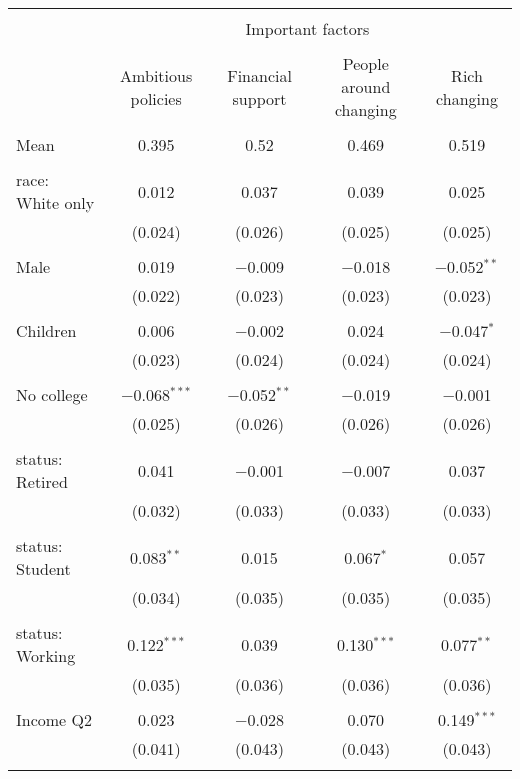 
\begin{tabular}{@{\extracolsep{5pt}}lcccc} 
\\[-1.8ex]\hline 
\hline \\[-1.8ex] 
 & \multicolumn{4}{c}{Important factors} \\ 
\cline{2-5} 
\\[-1.8ex] & Ambitious policies & Financial support & People around changing & Rich changing \\ 
\hline \\[-1.8ex] 
 Mean & 0.395 & 0.52 & 0.469 & 0.519  \\ \hline \\[-1.8ex] race: White only & 0.012 & 0.037 & 0.039 & 0.025 \\ 
  & (0.024) & (0.026) & (0.025) & (0.025) \\ 
  & & & & \\ 
 Male & 0.019 & $-$0.009 & $-$0.018 & $-$0.052$^{**}$ \\ 
  & (0.022) & (0.023) & (0.023) & (0.023) \\ 
  & & & & \\ 
 Children & 0.006 & $-$0.002 & 0.024 & $-$0.047$^{*}$ \\ 
  & (0.023) & (0.024) & (0.024) & (0.024) \\ 
  & & & & \\ 
 No college & $-$0.068$^{***}$ & $-$0.052$^{**}$ & $-$0.019 & $-$0.001 \\ 
  & (0.025) & (0.026) & (0.026) & (0.026) \\ 
  & & & & \\ 
 status: Retired & 0.041 & $-$0.001 & $-$0.007 & 0.037 \\ 
  & (0.032) & (0.033) & (0.033) & (0.033) \\ 
  & & & & \\ 
 status: Student & 0.083$^{**}$ & 0.015 & 0.067$^{*}$ & 0.057 \\ 
  & (0.034) & (0.035) & (0.035) & (0.035) \\ 
  & & & & \\ 
 status: Working & 0.122$^{***}$ & 0.039 & 0.130$^{***}$ & 0.077$^{**}$ \\ 
  & (0.035) & (0.036) & (0.036) & (0.036) \\ 
  & & & & \\ 
 Income Q2 & 0.023 & $-$0.028 & 0.070 & 0.149$^{***}$ \\ 
  & (0.041) & (0.043) & (0.043) & (0.043) \\ 
  & & & & \\ 

\end{tabular}
